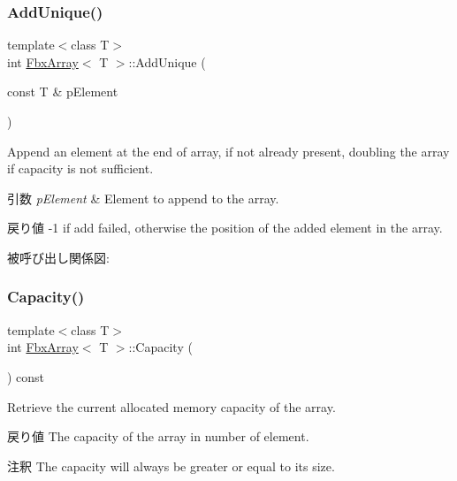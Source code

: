 \subsubsection{\texorpdfstring{Add\+Unique()}{AddUnique()}}
{\footnotesize\ttfamily template$<$class T$>$ \\
int \hyperlink{class_fbx_array}{Fbx\+Array}$<$ T $>$\+::Add\+Unique (\begin{DoxyParamCaption}\item[{const T \&}]{p\+Element }\end{DoxyParamCaption})}

Append an element at the end of array, if not already present, doubling the array if capacity is not sufficient. 
\begin{DoxyParams}{引数}
{\em p\+Element} & Element to append to the array. \\
\hline
\end{DoxyParams}
\begin{DoxyReturn}{戻り値}
-\/1 if add failed, otherwise the position of the added element in the array. 
\end{DoxyReturn}
被呼び出し関係図\+:
\mbox{\label{class_fbx_array_a5f9ef2d46a1176800ca5a95b760ebaab}} 
\subsubsection{\texorpdfstring{Capacity()}{Capacity()}}
{\footnotesize\ttfamily template$<$class T$>$ \\
int \hyperlink{class_fbx_array}{Fbx\+Array}$<$ T $>$\+::Capacity (\begin{DoxyParamCaption}{ }\end{DoxyParamCaption}) const}

Retrieve the current allocated memory capacity of the array. \begin{DoxyReturn}{戻り値}
The capacity of the array in number of element. 
\end{DoxyReturn}
\begin{DoxyRemark}{注釈}
The capacity will always be greater or equal to its size. 
\end{DoxyRemark}
\mbox{\label{class_fbx_array_afeb2b8c53e6364a2d7a82b7a9f7de75f}} 
